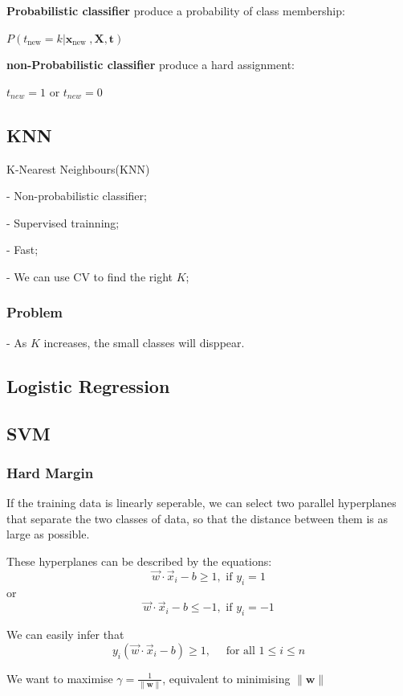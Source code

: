 \documentclass[12pt]{article}
\begin{document}
\textbf{Probabilistic classifier} produce a probability of class membership:

$P(t_{\text {new}}=k | \mathbf{x}_{\text {new }}, \mathbf{X}, \mathbf{t})$

\textbf{non-Probabilistic classifier} produce a hard assignment:

$t_{new}=1$ or $t_{new}=0$

\subsection{KNN}

K-Nearest Neighbours(KNN)

- Non-probabilistic classifier;

- Supervised trainning;

- Fast;

- We can use CV to find the right $K$;

\subsubsection{Problem}
- As $K$ increases, the small classes will disppear.

\subsection{Logistic Regression}

\subsection{SVM}
\subsubsection{Hard Margin}
If the training data is linearly seperable,
we can select two parallel hyperplanes that separate the two classes of data,
so that the distance between them is as large as possible.

These hyperplanes can be described by the equations:
$$
\vec{w} \cdot \vec{x}_{i}-b \geq 1, \text { if } y_{i}=1
$$
or
$$
\vec{w} \cdot \vec{x}_{i}-b \leq-1, \text { if } y_{i}=-1
$$

We can easily infer that 
$$
y_{i}\left(\vec{w} \cdot \vec{x}_{i}-b\right) \geq 1, \quad \text { for all } 1 \leq i \leq n
$$

We want to maximise $\gamma=\frac{1}{\|\mathbf{w}\|}$,
equivalent to minimising $\|\mathbf{w}\|$
\end{document}
